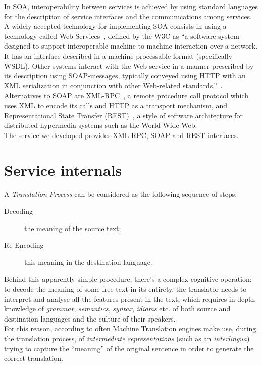 \documentclass[11pt]{article}
\begin{document}
In SOA, interoperability between services is achieved by using standard languages for the description of service interfaces and the communications
among services. A widely accepted technology for implementing SOA consists in using a technology called Web Services~\citep{soa}, defined by the W3C as 
``a software system designed to support interoperable machine-to-machine interaction over a network. 
It has an interface described in a machine-processable format (specifically WSDL). 
Other systems interact with the Web service in a manner prescribed by its description using SOAP-messages, typically conveyed using HTTP with an 
XML serialization in conjunction with other Web-related standards.''~\citep{wsgloss}. 
Alternatives to SOAP are XML-RPC~\citep{xmlrpcspec}, a remote procedure call protocol which uses XML to encode its calls and HTTP as a transport 
mechanism, and Representational State Transfer (REST)~\citep{rest}, a style of software architecture for distributed hypermedia systems such as 
the World Wide Web.\\

The service we developed provides XML-RPC, SOAP and REST interfaces.


\section{Service internals}

A \emph{Translation Process} can be considered as the following sequence of steps:

\begin{description}
 \item[Decoding] the meaning of the source text;
 \item[Re-Encoding] this meaning in the destination language.
\end{description}

Behind this apparently simple procedure, there's a complex cognitive operation: to decode the meaning of some free text in its entirety, the translator
needs to interpret and analyse all the features present in the text, which requires in-depth knowledge of \emph{grammar}, \emph{semantics}, \emph{syntax},
\emph{idioms} etc. of both source and destination languages and the culture of their speakers.\\

For this reason, according to \citep{arnoldea} often Machine Translation engines make use, during the translation process, of \emph{intermediate representations} 
(such as an \emph{interlingua}) trying to capture the ``meaning'' of the original sentence in order to generate the  correct translation.
\end{document}
